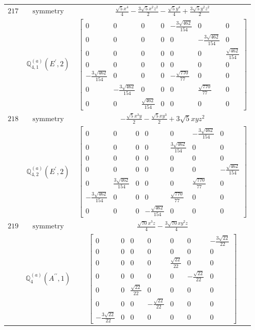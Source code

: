 \documentclass[fleqn,8pt,landscape]{jsarticle}
\begin{document}
\begin{longtable}{ccc}
$ 217 $ & $ \text{symmetry} $ & $ \frac{\sqrt{5} x^{4}}{4} - \frac{3 \sqrt{5} x^{2} z^{2}}{2} - \frac{\sqrt{5} y^{4}}{4} + \frac{3 \sqrt{5} y^{2} z^{2}}{2} $ \\
$  $ & $ \mathbb{Q}_{4,1}^{(a)}(E^{\prime},2) $ & $ \begin{bmatrix} 0 & 0 & 0 & 0 & - \frac{3 \sqrt{462}}{154} & 0 & 0 \\ 0 & 0 & 0 & 0 & 0 & - \frac{3 \sqrt{462}}{154} & 0 \\ 0 & 0 & 0 & 0 & 0 & 0 & \frac{\sqrt{462}}{154} \\ 0 & 0 & 0 & 0 & 0 & 0 & 0 \\ - \frac{3 \sqrt{462}}{154} & 0 & 0 & 0 & - \frac{\sqrt{770}}{77} & 0 & 0 \\ 0 & - \frac{3 \sqrt{462}}{154} & 0 & 0 & 0 & \frac{\sqrt{770}}{77} & 0 \\ 0 & 0 & \frac{\sqrt{462}}{154} & 0 & 0 & 0 & 0 \end{bmatrix} $ \\ \hline
$ 218 $ & $ \text{symmetry} $ & $ - \frac{\sqrt{5} x^{3} y}{2} - \frac{\sqrt{5} x y^{3}}{2} + 3 \sqrt{5} x y z^{2} $ \\
$  $ & $ \mathbb{Q}_{4,2}^{(a)}(E^{\prime},2) $ & $ \begin{bmatrix} 0 & 0 & 0 & 0 & 0 & - \frac{3 \sqrt{462}}{154} & 0 \\ 0 & 0 & 0 & 0 & \frac{3 \sqrt{462}}{154} & 0 & 0 \\ 0 & 0 & 0 & 0 & 0 & 0 & 0 \\ 0 & 0 & 0 & 0 & 0 & 0 & - \frac{\sqrt{462}}{154} \\ 0 & \frac{3 \sqrt{462}}{154} & 0 & 0 & 0 & \frac{\sqrt{770}}{77} & 0 \\ - \frac{3 \sqrt{462}}{154} & 0 & 0 & 0 & \frac{\sqrt{770}}{77} & 0 & 0 \\ 0 & 0 & 0 & - \frac{\sqrt{462}}{154} & 0 & 0 & 0 \end{bmatrix} $ \\ \hline
$ 219 $ & $ \text{symmetry} $ & $ \frac{\sqrt{70} x^{3} z}{4} - \frac{3 \sqrt{70} x y^{2} z}{4} $ \\
$  $ & $ \mathbb{Q}_{4}^{(a)}(A^{\prime\prime},1) $ & $ \begin{bmatrix} 0 & 0 & 0 & 0 & 0 & 0 & - \frac{3 \sqrt{22}}{22} \\ 0 & 0 & 0 & 0 & 0 & 0 & 0 \\ 0 & 0 & 0 & 0 & \frac{\sqrt{22}}{22} & 0 & 0 \\ 0 & 0 & 0 & 0 & 0 & - \frac{\sqrt{22}}{22} & 0 \\ 0 & 0 & \frac{\sqrt{22}}{22} & 0 & 0 & 0 & 0 \\ 0 & 0 & 0 & - \frac{\sqrt{22}}{22} & 0 & 0 & 0 \\ - \frac{3 \sqrt{22}}{22} & 0 & 0 & 0 & 0 & 0 & 0 \end{bmatrix} $ \\ \hline

\end{longtable}
\end{document}

